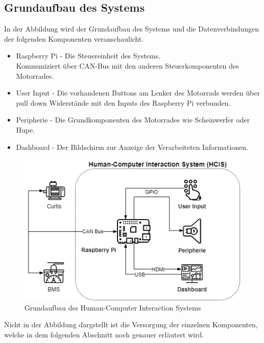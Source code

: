 \subsection{Grundaufbau des Systems}
In der Abbildung wird der Grundaufbau des Systems und die Datenverbindungen der folgenden  Komponenten veranschaulicht.

\begin{itemize}
	\item Raspberry Pi - Die Steuereinheit des Systems.
	\\ Kommuniziert über CAN-Bus mit den anderen Steuerkomponenten des Motorrades.
	\item User Input - Die vorhandenen Buttons am Lenker des Motorrads werden über pull down Widerstände mit den Inputs des Raspberry Pi verbunden. 
	\item Peripherie - Die Grundkomponenten des Motorrades wie Scheinwerfer oder Hupe.
	\item Dashboard - Der Bildschirm zur Anzeige der Verarbeiteten Informationen.
\end{itemize}

\begin{figure}[H]
	\begin{center}
		\includegraphics[scale=0.5]{figures/hcis/HCIS_Grundfunktion.png}
		\caption{Grundaufbau des Human-Computer Interaction Systems}
	\end{center}
\end{figure}

Nicht in der Abbildung dargstellt ist die Versorgung der einzelnen Komponenten, welche in dem folgenden Abschnitt noch genauer erläutert wird.

\newpage


